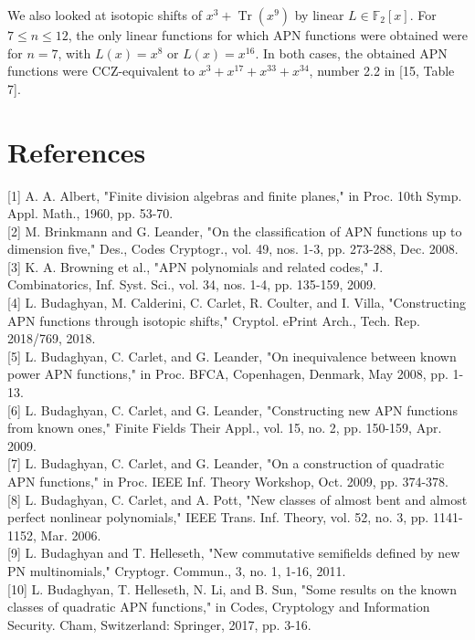 \documentclass[10pt]{article}
\begin{document}
We also looked at isotopic shifts of $x^{3}+\operatorname{Tr}\left(x^{9}\right)$ by linear $L \in \mathbb{F}_{2}[x]$. For $7 \leq n \leq 12$, the only linear functions for which APN functions were obtained were for $n=7$, with $L(x)=x^{8}$ or $L(x)=x^{16}$. In both cases, the obtained APN functions were CCZ-equivalent to $x^{3}+x^{17}+x^{33}+x^{34}$, number 2.2 in [15, Table 7].

\section*{References}
[1] A. A. Albert, "Finite division algebras and finite planes," in Proc. 10th Symp. Appl. Math., 1960, pp. 53-70.\\[0pt]
[2] M. Brinkmann and G. Leander, "On the classification of APN functions up to dimension five," Des., Codes Cryptogr., vol. 49, nos. 1-3, pp. 273-288, Dec. 2008.\\[0pt]
[3] K. A. Browning et al., "APN polynomials and related codes," J. Combinatorics, Inf. Syst. Sci., vol. 34, nos. 1-4, pp. 135-159, 2009.\\[0pt]
[4] L. Budaghyan, M. Calderini, C. Carlet, R. Coulter, and I. Villa, "Constructing APN functions through isotopic shifts," Cryptol. ePrint Arch., Tech. Rep. 2018/769, 2018.\\[0pt]
[5] L. Budaghyan, C. Carlet, and G. Leander, "On inequivalence between known power APN functions," in Proc. BFCA, Copenhagen, Denmark, May 2008, pp. 1-13.\\[0pt]
[6] L. Budaghyan, C. Carlet, and G. Leander, "Constructing new APN functions from known ones," Finite Fields Their Appl., vol. 15, no. 2, pp. 150-159, Apr. 2009.\\[0pt]
[7] L. Budaghyan, C. Carlet, and G. Leander, "On a construction of quadratic APN functions," in Proc. IEEE Inf. Theory Workshop, Oct. 2009, pp. 374-378.\\[0pt]
[8] L. Budaghyan, C. Carlet, and A. Pott, "New classes of almost bent and almost perfect nonlinear polynomials," IEEE Trans. Inf. Theory, vol. 52, no. 3, pp. 1141-1152, Mar. 2006.\\[0pt]
[9] L. Budaghyan and T. Helleseth, "New commutative semifields defined by new PN multinomials," Cryptogr. Commun., 3, no. 1, 1-16, 2011.\\[0pt]
[10] L. Budaghyan, T. Helleseth, N. Li, and B. Sun, "Some results on the known classes of quadratic APN functions," in Codes, Cryptology and Information Security. Cham, Switzerland: Springer, 2017, pp. 3-16.\\[0pt]
\end{document}

